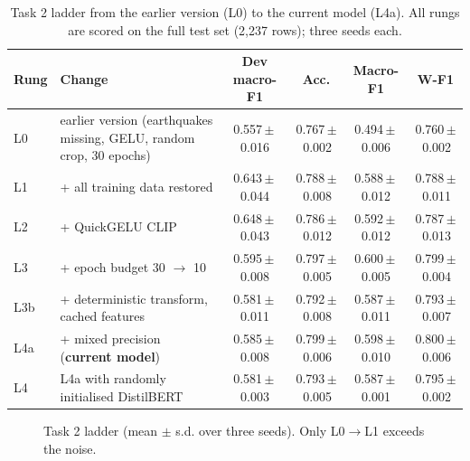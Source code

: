 \documentclass[conference]{IEEEtran}
\newcommand{\pmse}[2]{#1\,$\pm$\,#2}
\begin{document}
\begin{table}[t]
\centering
\caption{Task 2 ladder from the earlier version (L0) to the current model (L4a). All rungs are scored on the full test set (2,237 rows); three seeds each.}
\label{tab:ladder2}
\footnotesize
\begin{tabular}{llcccc}
\toprule
Rung & Change & Dev macro-F1 & Acc. & Macro-F1 & W-F1 \\
\midrule
L0 & earlier version (earthquakes missing, GELU, random crop, 30 epochs) & \pmse{0.557}{0.016} & \pmse{0.767}{0.002} & \pmse{0.494}{0.006} & \pmse{0.760}{0.002} \\
L1 & + all training data restored & \pmse{0.643}{0.044} & \pmse{0.788}{0.008} & \pmse{0.588}{0.012} & \pmse{0.788}{0.011} \\
L2 & + QuickGELU CLIP & \pmse{0.648}{0.043} & \pmse{0.786}{0.012} & \pmse{0.592}{0.012} & \pmse{0.787}{0.013} \\
L3 & + epoch budget 30 $\rightarrow$ 10 & \pmse{0.595}{0.008} & \pmse{0.797}{0.005} & \pmse{0.600}{0.005} & \pmse{0.799}{0.004} \\
L3b & + deterministic transform, cached features & \pmse{0.581}{0.011} & \pmse{0.792}{0.008} & \pmse{0.587}{0.011} & \pmse{0.793}{0.007} \\
L4a & + mixed precision (\textbf{current model}) & \pmse{0.585}{0.008} & \pmse{0.799}{0.006} & \pmse{0.598}{0.010} & \pmse{0.800}{0.006} \\
L4 & L4a with randomly initialised DistilBERT & \pmse{0.581}{0.003} & \pmse{0.793}{0.005} & \pmse{0.587}{0.001} & \pmse{0.795}{0.002} \\
\bottomrule
\end{tabular}
\end{table}

\begin{figure}[t]
\centering
{}
\caption{Task 2 ladder (mean $\pm$ s.d. over three seeds). Only L0$\rightarrow$L1 exceeds the noise.}
\label{fig:ladder}
\end{figure}
\end{document}
